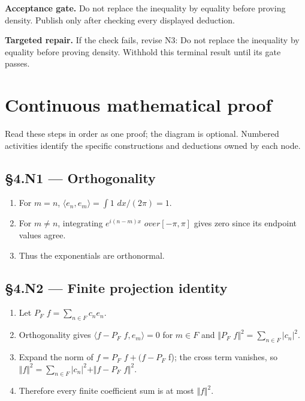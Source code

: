 \documentclass[preprint,12pt,aps,pra,showkeys,amsmath,amssymb,superscriptaddress,floatfix]{revtex4-2}
\theoremstyle{definition}
\theoremstyle{remark}
\newcommand{\field}[2]{\par\smallskip\noindent\textbf{#1.} #2\par}
\begin{document}
\field{Acceptance gate}{Do not replace the inequality by equality before proving density.
Publish only after checking every displayed deduction.}

\field{Targeted repair}{If the check fails, revise N3: Do not replace the inequality by equality
before proving density. Withhold this terminal result until its gate
passes.}

\endgroup\clearpage\section{Continuous mathematical proof}\label{sec:proof}

Read these steps in order as one proof; the diagram is optional.
Numbered activities identify the specific constructions and deductions
owned by each node.

\subsection{§4.N1 --- Orthogonality}\label{n1-orthogonality}

\begin{enumerate}
\def\labelenumi{\arabic{enumi}.}
\item
  For \(m=n\), \(\langle e_n,e_m\rangle =\int 1\) \(dx/(2\pi )=1\).
\item
  For \(m\ne n\), integrating \(e^{i(n-m)x}\) \(over[-\pi ,\pi ]\) gives
  zero since its endpoint values agree.
\item
  Thus the exponentials are orthonormal.
\end{enumerate}

\subsection{§4.N2 --- Finite projection
identity}\label{n2-finite-projection-identity}

\begin{enumerate}
\def\labelenumi{\arabic{enumi}.}
\item
  Let \(P_F\) \(f=\sum _{n\in F}c_ne_n\).
\item
  Orthogonality gives \(\langle f-P_F\) \(f,e_m\rangle =0\) for
  \(m\in F\) and \(\Vert P_F\) \(f\Vert ^{2}=\sum _{n\in F}|c_n|^{2}\).
\item
  Expand the norm of \(f=P_F\) \(f+(f-P_F\) f); the cross term vanishes,
  so \(\Vert f\Vert ^{2}=\sum _{n\in F}|c_n|^{2}+\Vert f-P_F\)
  \(f\Vert ^{2}\).
\item
  Therefore every finite coefficient sum is at most
  \(\Vert f\Vert ^{2}\).
\end{enumerate}
\end{document}
